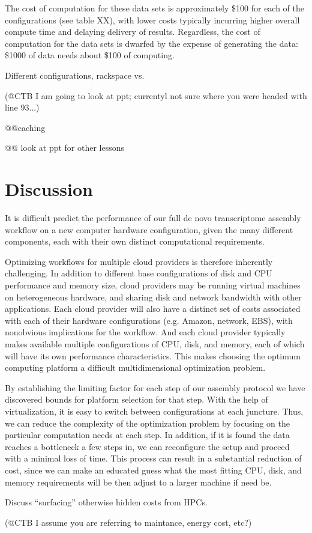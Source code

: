 \documentclass[11pt]{article}
\begin{document}
The cost of computation for these data sets is approximately \$100 for
each of the configurations (see table XX), with lower costs typically
incurring higher overall compute time and delaying delivery of results.
Regardless, the cost of computation for the data sets is dwarfed by
the expense of generating the data: \$1000 of data needs about \$100
of computing.

Different configurations, rackspace vs.

(@CTB I am going to look at ppt; currentyl not sure where you were headed
with line 93...)

@@caching

@@ look at ppt for other lessons

\section*{Discussion}

It is difficult predict the performance of our full de novo
transcriptome assembly workflow on a new computer hardware
configuration, given the many different components, each with
their own distinct computational requirements.  

Optimizing workflows for multiple cloud providers is therefore
inherently challenging.  In addition to different base configurations
of disk and CPU performance and memory size, cloud providers may be
running virtual machines on heterogeneous hardware, and sharing disk
and network bandwidth with other applications.  Each cloud provider
will also have a distinct set of costs associated with each of their
hardware configurations (e.g. Amazon, network, EBS), with nonobvious
implications for the workflow.  And each cloud provider typically
makes available multiple configurations of CPU, disk, and memory, each
of which will have its own performance characteristics.  This makes
choosing the optimum computing platform a difficult multidimensional
optimization problem.

By establishing the limiting factor for each step of our assembly protocol 
we have discovered bounds for platform selection for that step. With the help
of virtualization, it is easy to switch between configurations at each 
juncture. Thus, we can reduce the complexity of the optimization problem by 
focusing on the particular computation needs at each step. In addition, if it
is found the data reaches a bottleneck a few steps in, we can reconfigure the
setup and proceed with a minimal loss of time. This process can result in a 
substantial reduction of cost, since we can make an educated guess what the 
most fitting CPU, disk, and memory requirements will be then adjust to a larger
machine if need be.

Discuss ``surfacing'' otherwise hidden costs from HPCs.

(@CTB I assume you are referring to maintance, energy cost, etc?)
\end{document}
